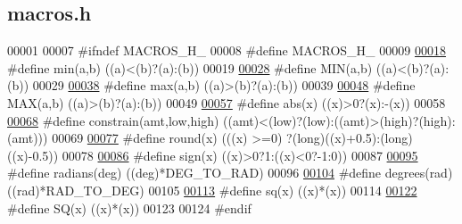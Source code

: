 \hypertarget{macros_8h_source}{}\subsection{macros.\+h}
\label{macros_8h_source}

\begin{DoxyCode}
00001 
00007 \textcolor{preprocessor}{#ifndef MACROS\_H\_}
00008 \textcolor{preprocessor}{#define MACROS\_H\_}
00009 
\hypertarget{macros_8h_source.tex_l00018}{}\hyperlink{macros_8h_ac6afabdc09a49a433ee19d8a9486056d}{00018} \textcolor{preprocessor}{#define min(a,b) ((a)<(b)?(a):(b))}
00019 
\hypertarget{macros_8h_source.tex_l00028}{}\hyperlink{macros_8h_a3acffbd305ee72dcd4593c0d8af64a4f}{00028} \textcolor{preprocessor}{#define MIN(a,b) ((a)<(b)?(a):(b))}
00029 
\hypertarget{macros_8h_source.tex_l00038}{}\hyperlink{macros_8h_affe776513b24d84b39af8ab0930fef7f}{00038} \textcolor{preprocessor}{#define max(a,b) ((a)>(b)?(a):(b))}
00039 
\hypertarget{macros_8h_source.tex_l00048}{}\hyperlink{macros_8h_afa99ec4acc4ecb2dc3c2d05da15d0e3f}{00048} \textcolor{preprocessor}{#define MAX(a,b) ((a)>(b)?(a):(b))}
00049 
\hypertarget{macros_8h_source.tex_l00057}{}\hyperlink{macros_8h_a3aa069ac3980707dae1e0530f50d59e4}{00057} \textcolor{preprocessor}{#define abs(x) ((x)>0?(x):-(x))}
00058 
\hypertarget{macros_8h_source.tex_l00068}{}\hyperlink{macros_8h_a7df4a1319e5665c9040aa1838eef987c}{00068} \textcolor{preprocessor}{#define constrain(amt,low,high) ((amt)<(low)?(low):((amt)>(high)?(high):(amt)))}
00069 
\hypertarget{macros_8h_source.tex_l00077}{}\hyperlink{macros_8h_a6ea10f4260b54a61665ead26cb995ba3}{00077} \textcolor{preprocessor}{#define round(x) (((x) >=0) ?(long)((x)+0.5):(long)((x)-0.5))}
00078 
\hypertarget{macros_8h_source.tex_l00086}{}\hyperlink{macros_8h_ac740756f75e53153605d2702b30d2a9d}{00086} \textcolor{preprocessor}{#define sign(x) ((x)>0?1:((x)<0?-1:0))}
00087 
\hypertarget{macros_8h_source.tex_l00095}{}\hyperlink{macros_8h_a7571dba2995b9cb57259345fe49d2f97}{00095} \textcolor{preprocessor}{#define radians(deg) ((deg)*DEG\_TO\_RAD)}
00096 
\hypertarget{macros_8h_source.tex_l00104}{}\hyperlink{macros_8h_afe93c2c14da376a1621194c15c1de496}{00104} \textcolor{preprocessor}{#define degrees(rad) ((rad)*RAD\_TO\_DEG)}
00105 
\hypertarget{macros_8h_source.tex_l00113}{}\hyperlink{macros_8h_ae7616788b30810a219d9cdee95904ba4}{00113} \textcolor{preprocessor}{#define sq(x) ((x)*(x))}
00114 
\hypertarget{macros_8h_source.tex_l00122}{}\hyperlink{macros_8h_ac3644f84794a8bfdacf39c4b2c2495fc}{00122} \textcolor{preprocessor}{#define SQ(x) ((x)*(x))}
00123 
00124 \textcolor{preprocessor}{#endif}
\end{DoxyCode}
